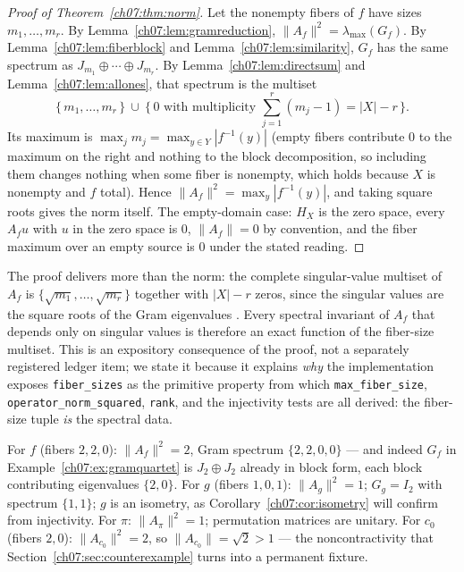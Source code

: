 \begin{proof}[Proof of Theorem~\textup{\ref{ch07:thm:norm}}]
Let the nonempty fibers of $f$ have sizes $m_1,\dots,m_r$. By
Lemma~\ref{ch07:lem:gramreduction},
$\lVert A_f\rVert^2=\lambda_{\max}(G_f)$. By
Lemma~\ref{ch07:lem:fiberblock} and Lemma~\ref{ch07:lem:similarity}, $G_f$
has the same spectrum as $J_{m_1}\oplus\cdots\oplus J_{m_r}$. By
Lemma~\ref{ch07:lem:directsum} and Lemma~\ref{ch07:lem:allones}, that
spectrum is the multiset
\[
\{\,m_1,\dots,m_r\,\}\ \cup\ \{\,0 \text{ with multiplicity }
\textstyle\sum_{j=1}^{r}(m_j-1)=|X|-r\,\}.
\]
Its maximum is $\max_j m_j=\max_{y\in Y}|f^{-1}(y)|$ (empty fibers contribute
$0$ to the maximum on the right and nothing to the block decomposition, so
including them changes nothing when some fiber is nonempty, which holds
because $X$ is nonempty and $f$ total). Hence
$\lVert A_f\rVert^2=\max_y|f^{-1}(y)|$, and taking square roots gives the
norm itself. The empty-domain case: $H_X$ is the zero space, every $A_f u$
with $u$ in the zero space is $0$, $\lVert A_f\rVert=0$ by convention, and
the fiber maximum over an empty source is $0$ under the stated reading.
\end{proof}

\begin{remark}\label{ch07:rem:singular}
The proof delivers more than the norm: the complete singular-value multiset
of $A_f$ is $\{\sqrt{m_1},\dots,\sqrt{m_r}\}$ together with $|X|-r$ zeros,
since the singular values are the square roots of the Gram eigenvalues
\cite{horn}. Every spectral invariant of $A_f$ that depends only on singular
values is therefore an exact function of the fiber-size multiset. This is an
expository consequence of the proof, not a separately registered ledger
item; we state it because it explains \emph{why} the implementation exposes
\texttt{fiber\_sizes} as the primitive property from which
\texttt{max\_fiber\_size}, \texttt{operator\_norm\_squared}, \texttt{rank},
and the injectivity tests are all derived: the fiber-size tuple \emph{is}
the spectral data.
\end{remark}

\begin{example}\label{ch07:ex:normquartet}
For $f$ (fibers $2,2,0$): $\lVert A_f\rVert^2=2$, Gram spectrum
$\{2,2,0,0\}$ --- and indeed $G_f$ in Example~\ref{ch07:ex:gramquartet} is
$J_2\oplus J_2$ already in block form, each block contributing eigenvalues
$\{2,0\}$. For $g$ (fibers $1,0,1$): $\lVert A_g\rVert^2=1$; $G_g=I_2$ with
spectrum $\{1,1\}$; $g$ is an isometry, as
Corollary~\ref{ch07:cor:isometry} will confirm from injectivity. For $\pi$:
$\lVert A_\pi\rVert^2=1$; permutation matrices are unitary. For $c_0$
(fibers $2,0$): $\lVert A_{c_0}\rVert^2=2$, so
$\lVert A_{c_0}\rVert=\sqrt{2}>1$ --- the noncontractivity that
Section~\ref{ch07:sec:counterexample} turns into a permanent fixture.
\end{example}

